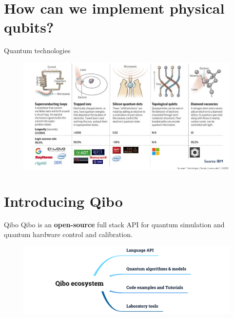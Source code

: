 \documentclass[11pt]{beamer}
\begin{document}


\section{How can we implement physical qubits?}

\begin{frame}{Quantum technologies}
    \begin{figure}
        \includegraphics[width=\textwidth]{figures/quantum_technologies.png}
    \end{figure}
\end{frame}


\section{Introducing Qibo}

\begin{frame}{Qibo}
    Qibo is an \textbf{open-source} full stack API for quantum simulation and quantum hardware control and calibration.
    \begin{figure}
        \includegraphics[width= \textwidth]{figures/overview.png}
    \end{figure}
    
\end{frame}
\end{document}
